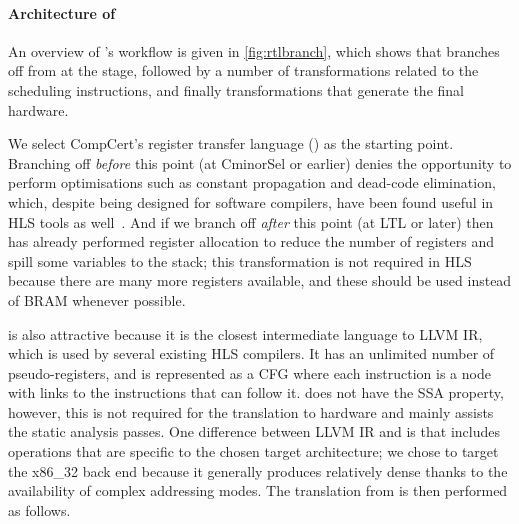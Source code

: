 \paragraph{Architecture of \vericert{}}

An overview of \vericert{}'s workflow is given in \cref{fig:rtlbranch}, which
shows that \vericert{} branches off from \compcert{} at the \rtl{} stage,
followed by a number of transformations related to the scheduling instructions,
and finally transformations that generate the final hardware.

We select CompCert's register transfer language (\rtl{}) as the starting
point. Branching off \emph{before} this point (at CminorSel or earlier) denies
\compcert{} the opportunity to perform optimisations such as constant
propagation and dead-code elimination, which, despite being designed for
software compilers, have been found useful in HLS tools as
well~\cite{cong11_high_level_synth_fpgas}. And if we branch off \emph{after}
this point (at LTL or later) then \compcert{} has already performed register
allocation to reduce the number of registers and spill some variables to the
stack; this transformation is not required in HLS because there are many more
registers available, and these should be used instead of \gls{BRAM} whenever
possible.

\rtl{} is also attractive because it is the closest intermediate language to
LLVM \gls{IR}, which is used by several existing HLS compilers.  It has an
unlimited number of pseudo-registers, and is represented as a \gls{CFG} where
each instruction is a node with links to the instructions that can follow it.
\rtl{} does not have the SSA property, however, this is not required for the
translation to hardware and mainly assists the static analysis passes.  One
difference between LLVM \gls{IR} and \rtl{} is that \rtl{} includes operations
that are specific to the chosen target architecture; we chose to target the
x86\_32 back end because it generally produces relatively dense \rtl{} thanks to
the availability of complex addressing modes.  The translation from \rtl{} is
then performed as follows.


